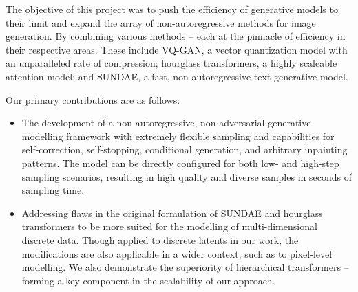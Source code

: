\documentclass[14pt,margin=0.5in,innermargin=0in,blockverticalspace=-0.1in,colspace=-1.0cm]{tikzposter}
\begin{document}
\begin{columns}
{\begin{tcolorbox}[boxsep=0pt,top=0cm,adjusted title={\Large\bf Proposed Method},colbacktitle=colorOne]

        \large
        The objective of this project was to push the efficiency of generative
        models to their limit and expand the array of non-autoregressive methods
        for image generation. By combining various methods -- each at the
        pinnacle of efficiency in their respective areas. These include VQ-GAN, a
        vector quantization model with an unparalleled rate of compression;
        hourglass transformers, a highly scaleable attention model; and SUNDAE,
        a fast, non-autoregressive text generative model.

        Our primary contributions are as follows:
        \begin{itemize}
            \item
                The development of a non-autoregressive, non-adversarial
                generative modelling framework with extremely flexible sampling
                and capabilities for self-correction, self-stopping, conditional
                generation, and arbitrary inpainting patterns. The model can be
                directly configured for both low- and high-step sampling
                scenarios, resulting in high quality and diverse samples in 
                seconds of sampling time.

            \item
                Addressing flaws in the original formulation of SUNDAE and
                hourglass transformers to be more suited for the modelling of
                multi-dimensional discrete data. Though applied to discrete
                latents in our work, the modifications are also applicable in a
                wider context, such as to pixel-level modelling. We also
                demonstrate the superiority of hierarchical transformers --
                forming a key component in the scalability of our approach. 


\end{itemize}
\end{tcolorbox}}
\end{columns}
\end{document}
